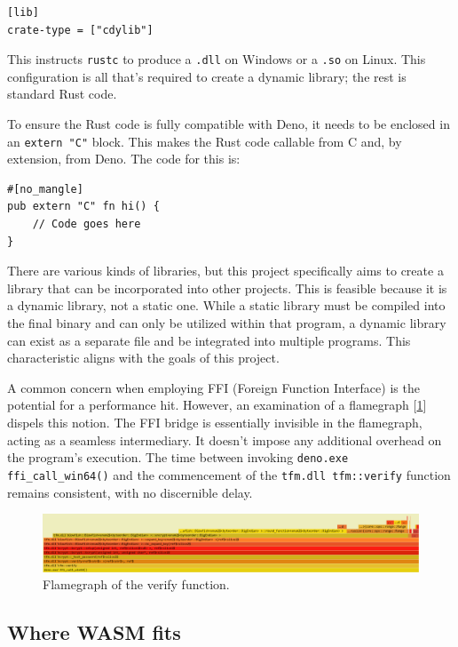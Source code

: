 \documentclass[10pt,journal,compsoc]{IEEEtran}
\begin{document}
\begin{lstlisting}
[lib]
crate-type = ["cdylib"]
\end{lstlisting}

This instructs \verb|rustc| to produce a \verb|.dll| on Windows or a \verb|.so| on Linux. This configuration is all that's required to create a dynamic library; the rest is standard Rust code.

To ensure the Rust code is fully compatible with Deno, it needs to be enclosed in an \verb|extern "C"| block. This makes the Rust code callable from C and, by extension, from Deno. The code for this is:

\begin{lstlisting}
#[no_mangle]
pub extern "C" fn hi() {
    // Code goes here
}
\end{lstlisting}

There are various kinds of libraries, but this project specifically aims to create a library that can be incorporated into other projects. This is feasible because it is a dynamic library, not a static one. While a static library must be compiled into the final binary and can only be utilized within that program, a dynamic library can exist as a separate file and be integrated into multiple programs. This characteristic aligns with the goals of this project.

A common concern when employing FFI (Foreign Function Interface) is the potential for a performance hit. However, an examination of a flamegraph [\ref{img:flamegraph}] dispels this notion. The FFI bridge is essentially invisible in the flamegraph, acting as a seamless intermediary. It doesn't impose any additional overhead on the program's execution. The time between invoking \verb|deno.exe ffi_call_win64()| and the commencement of the \verb|tfm.dll tfm::verify| function remains consistent, with no discernible delay.

\begin{figure}
    \centering
    \includegraphics[width=\textwidth]{flamegraph}
    \caption{Flamegraph of the verify function.}
    \label{img:flamegraph}
\end{figure}

\subsection{Where WASM fits}
\end{document}
